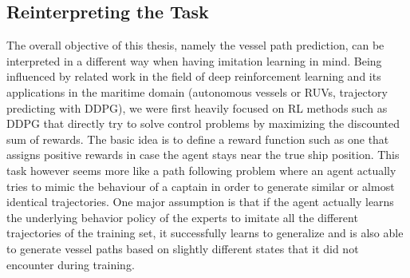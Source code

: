 \subsection{Reinterpreting the Task} \label{subchap:reinterpreting}
The overall objective of this thesis, namely the vessel path prediction, can be interpreted in a different way when having imitation learning in mind. Being influenced by related work in the field of deep reinforcement learning and its applications in the maritime domain (autonomous vessels or RUVs, trajectory predicting with DDPG), we were first heavily focused on RL methods such as DDPG that directly try to solve control problems by maximizing the discounted sum of rewards. The basic idea is to define a reward function such as one that assigns positive rewards in case the agent stays near the true ship position. This task however seems more like a path following problem where an agent actually tries to mimic the behaviour of a captain in order to generate similar or almost identical trajectories. One major assumption is that if the agent actually learns the underlying behavior policy of the experts to imitate all the different trajectories of the training set, it successfully learns to generalize and is also able to generate vessel paths based on slightly different states that it did not encounter during training.